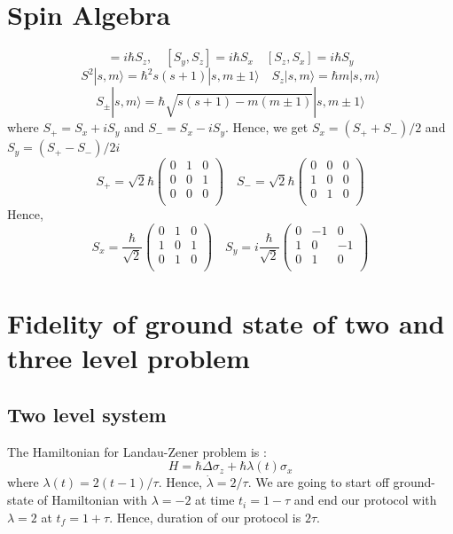 \documentclass[11pt,a4paper]{article}
\begin{document}
\section{Spin Algebra}\label{sec.spin_alegbra}
\begin{equation}
[S_x, S_y]=i \hbar S_z, \quad [S_y, S_z]=i \hbar S_x \quad [S_z, S_x]=i \hbar S_y
\end{equation}
\begin{equation}
S^2|s ,m \rangle = \hbar^2 s(s+1)|s ,m\pm 1\rangle  \quad S_z|s ,m \rangle = \hbar m |s ,m \rangle
\end{equation}
\begin{equation}
S_{\pm}|s, m\rangle = \hbar\sqrt{s(s+1)-m(m \pm 1)}|s,m \pm 1\rangle
\end{equation}
where $S_+ = S_x + iS_y$ and $S_- = S_x - iS_y $. Hence, we get $S_x = (S_+ + S_-)/2$ and $S_y = (S_+ - S_-)/2i $
\begin{equation}
S_+= \sqrt{2} \hbar\begin{pmatrix}
0 & 1 & 0\\
0 & 0 & 1\\
0 & 0 & 0\\
\end{pmatrix}
\quad
S_-=\sqrt{2} \hbar 
\begin{pmatrix}
0 & 0 & 0\\
1 & 0 & 0\\
0 & 1 & 0\\
\end{pmatrix}
\end{equation}
Hence, \begin{equation}
S_x= \frac{\hbar}{\sqrt{2} }
\begin{pmatrix}
0 & 1 & 0\\
1 & 0 & 1\\
0 & 1 & 0\\
\end{pmatrix} \quad
S_y=  i \frac{\hbar}{\sqrt{2} }
\begin{pmatrix}
0 & -1 & 0\\
1 & 0 & -1\\
0 & 1 & 0\\
\end{pmatrix}
\end{equation}

\section{Fidelity of ground state of two and three level problem}
\subsection*{Two level system}
The Hamiltonian for Landau-Zener problem is :
\begin{equation}
H= \hbar \Delta \sigma_z + \hbar \lambda(t) \sigma_x
\end{equation}
where $\lambda(t)= 2(t-1)/\tau$. Hence, $\dot{\lambda}= 2/\tau$. We are going to start off ground-state of Hamiltonian with $\lambda=-2$ at time $t_i= 1- \tau$ and end our protocol with  $\lambda=2$ at $t_f= 1+ \tau$. Hence, duration of our protocol is $2 \tau$. 
\end{document}
